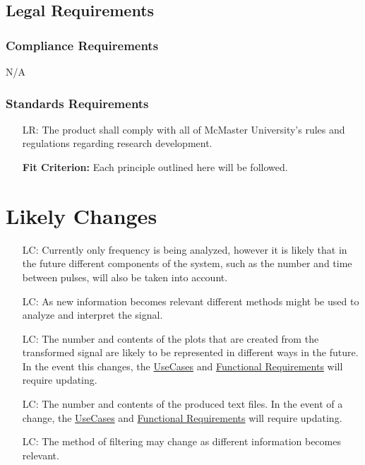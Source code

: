 \documentclass[12pt]{article}
\newcounter{legalnum}
\newcounter{lcnum} %
\begin{document}
\subsection{Legal Requirements}

\subsubsection{Compliance Requirements}

N/A

\subsubsection{Standards Requirements}

\noindent \begin{itemize}
\item[LR\refstepcounter{legalnum}\thelegalnum\label{NF_L1}:] The product shall
  comply with all of McMaster University's rules and regulations regarding
  research development.

  \textbf{Fit Criterion:} Each principle outlined here \cite{ResearchPrinciples} 
will be
  followed.
\end{itemize}

\section{Likely Changes}    

\noindent \begin{itemize}

\item[LC\refstepcounter{lcnum}\thelcnum\label{LC_comp}:] Currently only
  frequency is being analyzed, however it is likely that in the future different
  components of the system, such as the number and time between pulses, will
  also be taken into account.
\item[LC\refstepcounter{lcnum}\thelcnum\label{LC_signal}:] As new information
  becomes relevant different methods might be used to analyze and interpret the
  signal.
\item[LC\refstepcounter{lcnum}\thelcnum\label{LC_plot}:] The number and 
contents of the plots that are created from the transformed signal are likely 
to be represented in different ways in the future. In the event this changes,
the \hyperref[UseCase]{UseCases} and \hyperref[Func]{Functional Requirements}
will require updating.
\item[LC\refstepcounter{lcnum}\thelcnum\label{LC_output}:]The number and 
contents of the produced text files. In the event of a change,
the \hyperref[UseCase]{UseCases} and \hyperref[Func]{Functional Requirements}
will require updating.
\item[LC\refstepcounter{lcnum}\thelcnum\label{LC_filter}:] The method of 
filtering may change as different information becomes relevant.
\end{itemize}
\newpage
\end{document}
